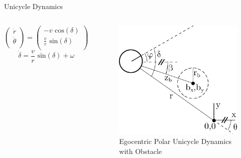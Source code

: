 \documentclass[10pt]{beamer}
\begin{document}
\begin{frame}{Unicycle Dynamics}
\begin{columns}
\begin{equation}
\left(
\begin{matrix}
\dot{r}\\
\dot{\theta}\\
\end{matrix}
\right)
=
\left(
\begin{matrix}
- v \text{ cos}(\delta)\\
\frac{v}{r} \text{ sin}(\delta)\\
\end{matrix}
\right)
\end{equation}
\begin{equation}
\dot{\delta}=\frac{v}{r} \text{ sin}(\delta)+\omega
\end{equation}
\begin{figure}[h!]
\begin{center}
\includegraphics[scale=0.45]{obs.pdf} 
\caption{Egocentric Polar Unicycle Dynamics with Obstacle\label{fig:obs}} 
\end{center}
\end{figure}
\end{columns}
\end{frame}
\end{document}
